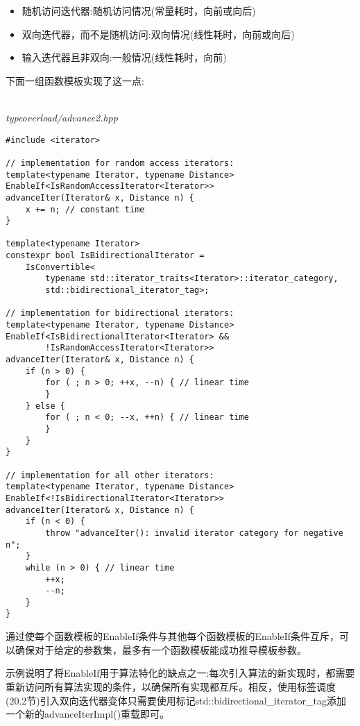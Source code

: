 \begin{itemize}
\item 
随机访问迭代器:随机访问情况(常量耗时，向前或向后)

\item
双向迭代器，而不是随机访问:双向情况(线性耗时，向前或向后)

\item
输入迭代器且非双向:一般情况(线性耗时，向前)
\end{itemize}

下面一组函数模板实现了这一点:

\hspace*{\fill} \\ %
\noindent
\textit{typeoverload/advance2.hpp}
\begin{lstlisting}[style=styleCXX]
#include <iterator>

// implementation for random access iterators:
template<typename Iterator, typename Distance>
EnableIf<IsRandomAccessIterator<Iterator>>
advanceIter(Iterator& x, Distance n) {
	x += n; // constant time
}

template<typename Iterator>
constexpr bool IsBidirectionalIterator =
	IsConvertible<
		typename std::iterator_traits<Iterator>::iterator_category,
		std::bidirectional_iterator_tag>;

// implementation for bidirectional iterators:
template<typename Iterator, typename Distance>
EnableIf<IsBidirectionalIterator<Iterator> &&
		!IsRandomAccessIterator<Iterator>>
advanceIter(Iterator& x, Distance n) {
	if (n > 0) {
		for ( ; n > 0; ++x, --n) { // linear time
		}
	} else {
		for ( ; n < 0; --x, ++n) { // linear time
		}
	}
}

// implementation for all other iterators:
template<typename Iterator, typename Distance>
EnableIf<!IsBidirectionalIterator<Iterator>>
advanceIter(Iterator& x, Distance n) {
	if (n < 0) {
		throw "advanceIter(): invalid iterator category for negative n";
	}
	while (n > 0) { // linear time
		++x;
		--n;
	}
}
\end{lstlisting}

通过使每个函数模板的EnableIf条件与其他每个函数模板的EnableIf条件互斥，可以确保对于给定的参数集，最多有一个函数模板能成功推导模板参数。

示例说明了将EnableIf用于算法特化的缺点之一:每次引入算法的新实现时，都需要重新访问所有算法实现的条件，以确保所有实现都互斥。相反，使用标签调度(20.2节)引入双向迭代器变体只需要使用标记std::bidirectional\_iterator\_tag添加一个新的advanceIterImpl()重载即可。

